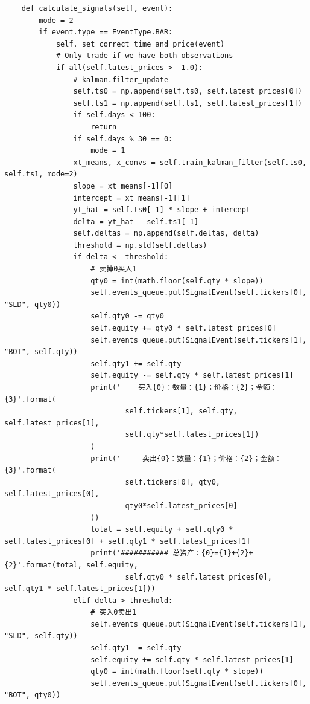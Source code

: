 \documentclass{article}
\begin{document}
\begin{lstlisting}
    def calculate_signals(self, event):
        mode = 2
        if event.type == EventType.BAR:
            self._set_correct_time_and_price(event)
            # Only trade if we have both observations
            if all(self.latest_prices > -1.0):
                # kalman.filter_update
                self.ts0 = np.append(self.ts0, self.latest_prices[0])
                self.ts1 = np.append(self.ts1, self.latest_prices[1])
                if self.days < 100:
                    return
                if self.days % 30 == 0:
                    mode = 1
                xt_means, x_convs = self.train_kalman_filter(self.ts0, self.ts1, mode=2)
                slope = xt_means[-1][0]
                intercept = xt_means[-1][1]
                yt_hat = self.ts0[-1] * slope + intercept
                delta = yt_hat - self.ts1[-1]
                self.deltas = np.append(self.deltas, delta)
                threshold = np.std(self.deltas)
                if delta < -threshold:
                    # 卖掉0买入1
                    qty0 = int(math.floor(self.qty * slope))
                    self.events_queue.put(SignalEvent(self.tickers[0], "SLD", qty0))
                    self.qty0 -= qty0
                    self.equity += qty0 * self.latest_prices[0]
                    self.events_queue.put(SignalEvent(self.tickers[1], "BOT", self.qty))
                    self.qty1 += self.qty
                    self.equity -= self.qty * self.latest_prices[1]
                    print('    买入{0}：数量：{1}；价格：{2}；金额：{3}'.format(
                            self.tickers[1], self.qty, self.latest_prices[1], 
                            self.qty*self.latest_prices[1])
                    )
                    print('     卖出{0}：数量：{1}；价格：{2}；金额：{3}'.format(
                            self.tickers[0], qty0, self.latest_prices[0],
                            qty0*self.latest_prices[0]
                    ))
                    total = self.equity + self.qty0 * self.latest_prices[0] + self.qty1 * self.latest_prices[1]
                    print('########### 总资产：{0}={1}+{2}+{2}'.format(total, self.equity, 
                            self.qty0 * self.latest_prices[0], self.qty1 * self.latest_prices[1]))
                elif delta > threshold:
                    # 买入0卖出1
                    self.events_queue.put(SignalEvent(self.tickers[1], "SLD", self.qty))
                    self.qty1 -= self.qty
                    self.equity += self.qty * self.latest_prices[1]
                    qty0 = int(math.floor(self.qty * slope))
                    self.events_queue.put(SignalEvent(self.tickers[0], "BOT", qty0))

\end{lstlisting}
\end{document}
